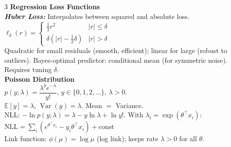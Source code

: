 \documentclass[a4paper,7pt]{article}
\begin{document}
\begin{multicols*}{3}
\textbf{Regression Loss Functions}\\

\textit{\textbf{Huber Loss:}} Interpolates between squared and absolute loss.\\
$\ell_\delta(r)=\begin{cases}\frac{1}{2}r^2 & |r|\leq\delta\\\delta(|r|-\frac{1}{2}\delta) & |r|>\delta\end{cases}$\\
Quadratic for small residuals (smooth, efficient); linear for large (robust to outliers). Bayes-optimal predictor: conditional mean (for symmetric noise). Requires tuning $\delta$.\\

\textbf{Poisson Distribution}\\
$p(y;\lambda)=\dfrac{\lambda^y e^{-\lambda}}{y!}$, $y\in\{0,1,2,\ldots\}$, $\lambda>0$.\\
$\mathbb{E}[y]=\lambda$, $\operatorname{Var}(y)=\lambda$. Mean $=$ Variance.\\
NLL: $-\ln p(y;\lambda)=\lambda-y\ln\lambda+\ln y!$. With $\lambda_i=\exp(\theta^\top x_i)$:\\
$\mathrm{NLL}=\sum_i(e^{\theta^\top x_i}-y_i\theta^\top x_i)+\mathrm{const}$\\
Link function: $\phi(\mu)=\log\mu$ (log link); keeps rate $\lambda>0$ for all $\theta$.\\

\end{multicols*}
\end{document}
